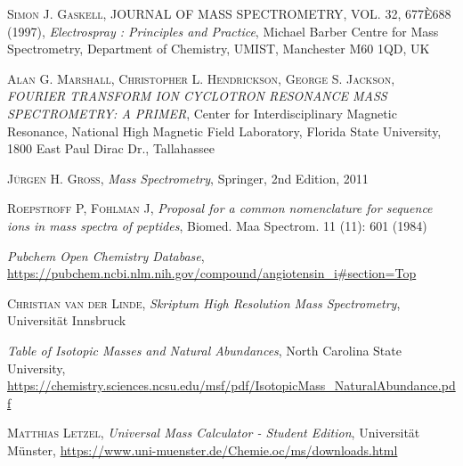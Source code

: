 \documentclass[a4paper,10pt]{article}
\begin{document}
\begin{thebibliography}{99}
\textsc{Simon J. Gaskell}, JOURNAL OF MASS SPECTROMETRY, VOL. 32, 677È688 (1997), \textit{Electrospray : Principles and Practice}, Michael Barber Centre for Mass Spectrometry, Department of Chemistry, UMIST, Manchester M60 1QD, UK

\textsc{Alan G. Marshall, Christopher L. Hendrickson, George S. Jackson}, \textit{FOURIER TRANSFORM ION CYCLOTRON RESONANCE MASS SPECTROMETRY: A PRIMER}, Center for Interdisciplinary Magnetic Resonance, National High Magnetic Field Laboratory, Florida State University, 1800 East Paul Dirac Dr., Tallahassee

\textsc{Jürgen H. Gross}, \textit{Mass Spectrometry}, Springer, 2nd Edition, 2011

\textsc{Roepstroff P, Fohlman J}, \textit{Proposal for a common nomenclature for sequence ions in mass spectra of peptides}, Biomed. Maa Spectrom. 11 (11): 601 (1984)

\textit{Pubchem Open Chemistry Database}, \url{https://pubchem.ncbi.nlm.nih.gov/compound/angiotensin_i#section=Top}

\textsc{Christian van der Linde}, \textit{Skriptum High Resolution Mass Spectrometry}, Universität Innsbruck

\textit{Table of Isotopic Masses and Natural Abundances}, North Carolina State University, \url{https://chemistry.sciences.ncsu.edu/msf/pdf/IsotopicMass_NaturalAbundance.pdf}

\textsc{Matthias Letzel}, \textit{Universal Mass Calculator - Student Edition}, Universität Münster, \url{https://www.uni-muenster.de/Chemie.oc/ms/downloads.html}

\end{thebibliography}
\end{document}
